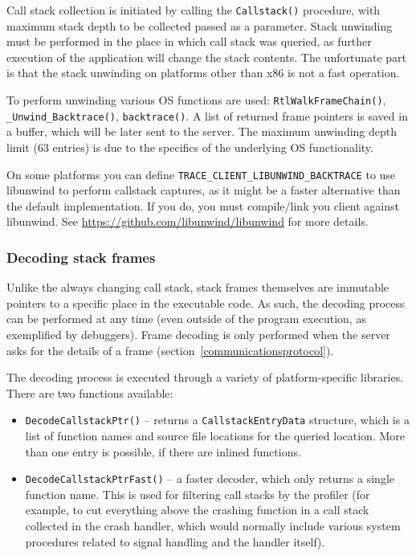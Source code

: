 \documentclass[hidelinks,titlepage,a4paper]{article}
\begin{document}
Call stack collection is initiated by calling the \texttt{Callstack()} procedure, with maximum stack depth to be collected passed as a parameter. Stack unwinding must be performed in the place in which call stack was queried, as further execution of the application will change the stack contents. The unfortunate part is that the stack unwinding on platforms other than x86 is not a fast operation.

To perform unwinding various OS functions are used: \texttt{RtlWalkFrameChain()}, \texttt{\_Unwind\_Backtrace()}, \texttt{backtrace()}. A list of returned frame pointers is saved in a buffer, which will be later sent to the server. The maximum unwinding depth limit (63 entries) is due to the specifics of the underlying OS functionality.

On some platforms you can define \texttt{TRACE\_CLIENT\_LIBUNWIND\_BACKTRACE} to use libunwind to perform callstack captures, as it might be a faster alternative than the default implementation. If you do, you must compile/link you client against libunwind. See \url{https://github.com/libunwind/libunwind} for more details.

\subsubsection{Decoding stack frames}

Unlike the always changing call stack, stack frames themselves are immutable pointers to a specific place in the executable code. As such, the decoding process can be performed at any time (even outside of the program execution, as exemplified by debuggers). Frame decoding is only performed when the server asks for the details of a frame (section~\ref{communicationsprotocol}).

The decoding process is executed through a variety of platform-specific libraries. There are two functions available:

\begin{itemize}
\item \texttt{DecodeCallstackPtr()} -- returns a \texttt{CallstackEntryData} structure, which is a list of function names and source file locations for the queried location. More than one entry is possible, if there are inlined functions.
\item \texttt{DecodeCallstackPtrFast()} -- a faster decoder, which only returns a single function name. This is used for filtering call stacks by the profiler (for example, to cut everything above the crashing function in a call stack collected in the crash handler, which would normally include various system procedures related to signal handling and the handler itself).
\end{itemize}
\end{document}
